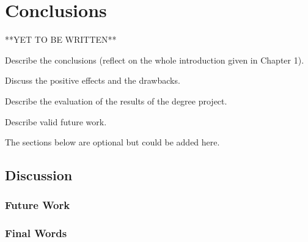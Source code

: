 \chapter{Conclusions}

**YET TO BE WRITTEN**

Describe the conclusions (reflect on the whole introduction given in Chapter 1). 

Discuss the positive effects and the drawbacks. 

Describe the evaluation of the results of the degree project.

Describe valid future work.  

The sections below are optional but could be added here.

\section{Discussion}

\subsection{Future Work}

\subsection{Final Words}







